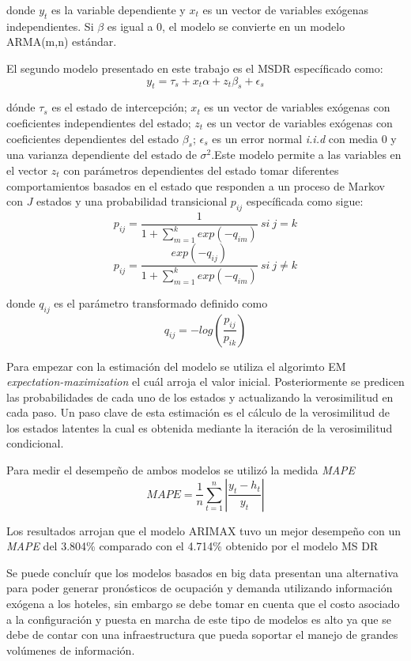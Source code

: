 {donde $y_t$ es la variable dependiente y $x_t$ es un vector de variables exógenas independientes. Si $\beta$ es igual a 0, el modelo se convierte en un modelo ARMA(m,n) estándar.

El segundo modelo presentado en este trabajo es el MSDR específicado como: $$y_t = \tau_s + x_t \alpha + z_t \beta_s + \epsilon_s$$

dónde $\tau_s$ es el estado de intercepción; $x_t$ es un vector de variables exógenas con coeficientes independientes del estado; $z_t$ es un vector de variables exógenas con coeficientes dependientes del estado $\beta_s$; $\epsilon_s$ es un error normal \emph{i.i.d} con media 0 y una varianza dependiente del estado de $\sigma^2$.Este modelo permite a las variables en el vector $z_t$ con parámetros dependientes del estado tomar diferentes comportamientos basados en el estado que responden a un proceso de Markov con $J$ estados y una probabilidad transicional $p_{ij}$ específicada como sigue: $$p_{ij} = \frac{1}{1 + \sum_{m=1}^{k} exp(-q_{im})}\ si\ j = k$$ $$p_{ij} = \frac{exp(-q_{ij})}{1 + \sum_{m=1}^{k} exp(-q_{im})}\ si\ j \neq k$$

donde $q_{ij}$ es el parámetro transformado definido como $$q_{ij}=-log(\frac{p_{ij}}{p_{ik}})$$

Para empezar con la estimación del modelo se utiliza el algorimto EM \emph{expectation-maximization} el cuál arroja el valor inicial. Posteriormente se predicen las probabilidades de cada uno de los estados y actualizando la verosimilitud en cada paso. Un paso clave de esta estimación es el cálculo de la verosimilitud de los estados latentes la cual es obtenida mediante la iteración de la verosimilitud condicional.

Para medir el desempeño de ambos modelos se utilizó la medida \emph{MAPE} $$MAPE=\frac{1}{n}\sum_{t=1}^{n}|\frac{y_t-h_t}{y_t}|$$ 

Los resultados arrojan que el modelo ARIMAX tuvo un mejor desempeño con un \emph{MAPE} del 3.804\% comparado con el 4.714\% obtenido por el modelo MS DR

Se puede concluír que los modelos basados en big data presentan una alternativa para poder generar pronósticos de ocupación y demanda utilizando información exógena a los hoteles, sin embargo se debe tomar en cuenta que el costo asociado a la configuración y puesta en marcha de este tipo de modelos es alto ya que se debe de contar con una infraestructura que pueda soportar el manejo de grandes volúmenes de información.


}
